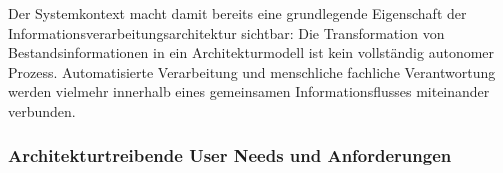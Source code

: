 Der Systemkontext macht damit bereits eine grundlegende Eigenschaft der
Informationsverarbeitungsarchitektur sichtbar: Die Transformation von
Bestandsinformationen in ein Architekturmodell ist kein vollständig autonomer
Prozess. Automatisierte Verarbeitung und menschliche fachliche Verantwortung
werden vielmehr innerhalb eines gemeinsamen Informationsflusses miteinander
verbunden.


\subsubsection{Architekturtreibende User Needs und Anforderungen}
\label{sec:architekturtreibende_bedarfe}

%
%
%
%
%
%
%
%
%
%
%
%
%
%
%


